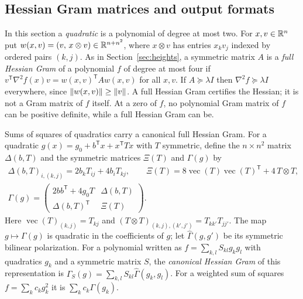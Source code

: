 \subsection{Hessian Gram matrices and output formats}
\label{sec:algebraic-models}

In this section a \emph{quadratic} is a polynomial of degree at most two. For
$x,v\in\mathbb R^n$ put $w(x,v)=(v,\,x\otimes v)\in\mathbb R^{n+n^2}$, where
$x\otimes v$ has entries $x_kv_j$ indexed by ordered pairs $(k,j)$. As in
Section~\ref{sec:heights}, a symmetric matrix $A$ is a \emph{full Hessian
Gram} of a polynomial $f$ of degree at most four if
$v^{\mathsf T}\nabla^2f(x)v=w(x,v)^{\mathsf T}Aw(x,v)$ for all $x,v$. If
$A\succeq\lambda I$ then $\nabla^2f\succeq\lambda I$ everywhere, since
$\left\lVert w(x,v)\right\rVert\ge\left\lVert v\right\rVert$. A full Hessian Gram certifies the Hessian; it is
not a Gram matrix of $f$ itself. At a zero of $f$, no polynomial Gram matrix
of $f$ can be positive definite, while a full Hessian Gram can be.

Sums of squares of quadratics carry a canonical full Hessian Gram. For a
quadratic $g(x)=g_0+b^{\mathsf T}x+x^{\mathsf T}Tx$ with $T$ symmetric,
define the $n\times n^2$ matrix $\Delta(b,T)$ and the symmetric matrices
$\Xi(T)$ and $\Gamma(g)$ by
\begin{equation}
\begin{gathered}
 \Delta(b,T)_{i,(k,j)}=2b_kT_{ij}+4b_iT_{kj},\qquad
 \Xi(T)=8\operatorname{vec}(T)\operatorname{vec}(T)^{\mathsf T}+4\,T\otimes T,\\
 \Gamma(g)=\begin{pmatrix}2bb^{\mathsf T}+4g_0T&\Delta(b,T)\\
            \Delta(b,T)^{\mathsf T}&\Xi(T)\end{pmatrix}.
\end{gathered}
 \label{eq:algebraic-canonical}
\end{equation}
Here $\operatorname{vec}(T)_{(k,j)}=T_{kj}$ and
$(T\otimes T)_{(k,j),(k',j')}=T_{kk'}T_{jj'}$. The map $g\mapsto\Gamma(g)$ is
quadratic in the coefficients of $g$; let $\widehat\Gamma(g,g')$ be its
symmetric bilinear polarization. For a polynomial written as
$f=\sum_{k,l}S_{kl}g_kg_l$ with quadratics $g_k$ and a symmetric matrix $S$,
the \emph{canonical Hessian Gram} of this representation is
$\Gamma_S(g)=\sum_{k,l}S_{kl}\widehat\Gamma(g_k,g_l)$. For a weighted sum of
squares $f=\sum_kc_kg_k^2$ it is $\sum_kc_k\Gamma(g_k)$.


